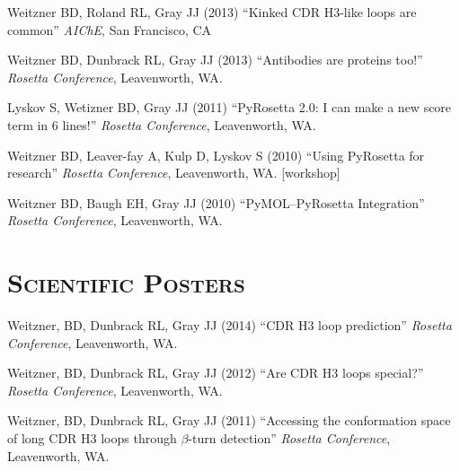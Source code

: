 \documentclass[12pt]{scrartcl}
\newcommand{\smallcapsspacing}[1]{{\addfontfeature{LetterSpace=5.0}#1}}
\renewcommand{\textsc}[1]{\smallcapsspacing{\scshape{#1}}}
\begin{document}
\vspace{0.75\baselineskip}

\noindent Weitzner BD, Roland RL, Gray JJ (2013) ``Kinked CDR H3-like loops are common'' \textit{AIChE}, San Francisco, CA

\vspace{0.75\baselineskip}

\noindent Weitzner BD, Dunbrack RL, Gray JJ (2013) ``Antibodies are proteins too!'' \textit{Rosetta Conference}, Leavenworth, WA.

\vspace{0.75\baselineskip}

\noindent Lyskov S, Wetizner BD, Gray JJ (2011) ``PyRosetta 2.0: I can make a new score term in 6 lines!'' \textit{Rosetta Conference}, Leavenworth, WA.

\vspace{0.75\baselineskip}

\noindent Weitzner BD, Leaver-fay A, Kulp D,  Lyskov S (2010) ``Using PyRosetta for research'' \textit{Rosetta Conference}, Leavenworth, WA. [workshop]

\vspace{0.75\baselineskip}

\noindent Weitzner BD, Baugh EH, Gray JJ (2010) ``PyMOL--PyRosetta Integration'' \textit{Rosetta Conference}, Leavenworth, WA.

\pagebreak
\section*{\textsc{Scientific Posters}}
\noindent Weitzner, BD, Dunbrack RL, Gray JJ (2014) ``CDR H3 loop prediction'' \textit{Rosetta Conference}, Leavenworth, WA.

\vspace{0.75\baselineskip}

\noindent Weitzner, BD, Dunbrack RL, Gray JJ (2012) ``Are CDR H3 loops special?'' \textit{Rosetta Conference}, Leavenworth, WA.

\vspace{0.75\baselineskip}

\noindent Weitzner, BD, Dunbrack RL, Gray JJ (2011) ``Accessing the conformation space of long CDR H3 loops through $\beta$-turn detection'' \textit{Rosetta Conference}, Leavenworth, WA.
\end{document}
